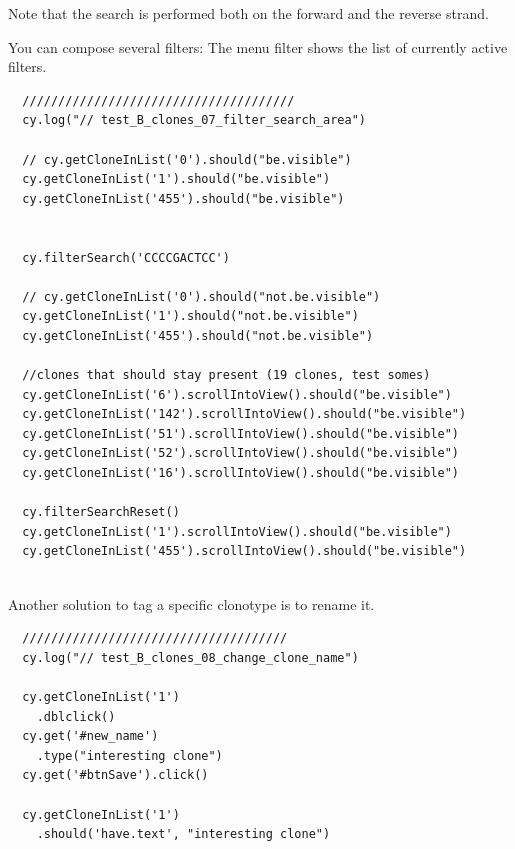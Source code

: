 Note that the search is performed both on the forward and the reverse strand.

You can compose several filters:
The menu filter shows the list of currently active filters.

\begin{verbatim}
  //////////////////////////////////////
  cy.log("// test_B_clones_07_filter_search_area")

  // cy.getCloneInList('0').should("be.visible")
  cy.getCloneInList('1').should("be.visible")
  cy.getCloneInList('455').should("be.visible")


  cy.filterSearch('CCCCGACTCC')

  // cy.getCloneInList('0').should("not.be.visible")
  cy.getCloneInList('1').should("not.be.visible")
  cy.getCloneInList('455').should("not.be.visible")

  //clones that should stay present (19 clones, test somes)
  cy.getCloneInList('6').scrollIntoView().should("be.visible")
  cy.getCloneInList('142').scrollIntoView().should("be.visible")
  cy.getCloneInList('51').scrollIntoView().should("be.visible")
  cy.getCloneInList('52').scrollIntoView().should("be.visible")
  cy.getCloneInList('16').scrollIntoView().should("be.visible")

  cy.filterSearchReset()
  cy.getCloneInList('1').scrollIntoView().should("be.visible")
  cy.getCloneInList('455').scrollIntoView().should("be.visible")


\end{verbatim}  
\bigskip

Another solution to tag a specific clonotype is to rename it.
\begin{verbatim}
  /////////////////////////////////////
  cy.log("// test_B_clones_08_change_clone_name")

  cy.getCloneInList('1')
    .dblclick()
  cy.get('#new_name')
    .type("interesting clone")
  cy.get('#btnSave').click()

  cy.getCloneInList('1')
    .should('have.text', "interesting clone")

\end{verbatim}


